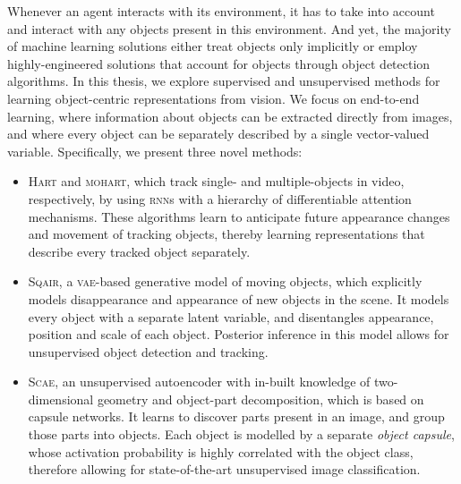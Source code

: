
Whenever an agent interacts with its environment, it has to take into account and interact with any objects present in this environment.
And yet, the majority of machine learning solutions either treat objects only implicitly or employ highly-engineered solutions that account for objects through object detection algorithms.
In this thesis, we explore supervised and unsupervised methods for learning object-centric representations from vision.
We focus on end-to-end learning, where information about objects can be extracted directly from images, and where every object can be separately described by a single vector-valued variable.
Specifically, we present three novel methods:
\begin{itemize}
	\item \textsc{Hart} and \textsc{mohart}, which track single- and multiple-objects in video, respectively, by using \textsc{rnn}s with a hierarchy of differentiable attention mechanisms.
	These algorithms learn to anticipate future appearance changes and movement of tracking objects, thereby learning representations that describe every tracked object separately.
	\item \textsc{Sqair}, a \textsc{vae}-based generative model of moving objects, which explicitly models disappearance and appearance of new objects in the scene.
	It models every object with a separate latent variable, and disentangles appearance, position and scale of each object.
	Posterior inference in this model allows for unsupervised object detection and tracking.
	\item \textsc{Scae}, an unsupervised autoencoder with in-built knowledge of two-dimensional geometry and object-part decomposition, which is based on capsule networks.
	It learns to discover parts present in an image, and group those parts into objects.
	Each object is modelled by a separate \textit{object capsule}, whose activation probability is highly correlated with the object class, therefore allowing for state-of-the-art unsupervised image classification. 
\end{itemize}